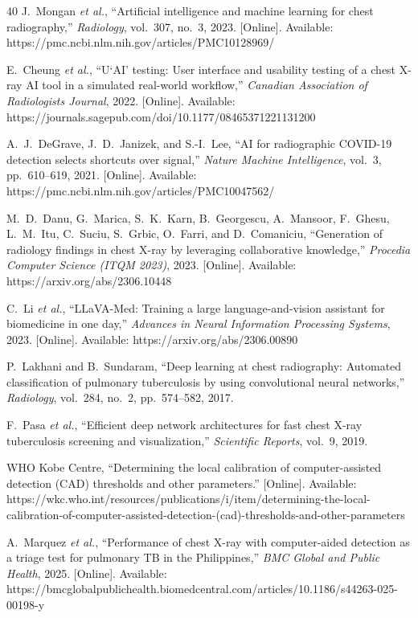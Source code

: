 \documentclass[conference, letterpaper]{IEEEtran}
\begin{document}
\begin{thebibliography}{40}
J.~Mongan \textit{et al.}, ``Artificial intelligence and machine learning for chest radiography,'' \textit{Radiology}, vol.~307, no.~3, 2023. [Online]. Available: https://pmc.ncbi.nlm.nih.gov/articles/PMC10128969/

E.~Cheung \textit{et al.}, ``U`AI' testing: User interface and usability testing of a chest X-ray AI tool in a simulated real-world workflow,'' \textit{Canadian Association of Radiologists Journal}, 2022. [Online]. Available: https://journals.sagepub.com/doi/10.1177/08465371221131200

A.~J.~DeGrave, J.~D.~Janizek, and S.-I.~Lee, ``AI for radiographic COVID-19 detection selects shortcuts over signal,'' \textit{Nature Machine Intelligence}, vol.~3, pp.~610--619, 2021. [Online]. Available: https://pmc.ncbi.nlm.nih.gov/articles/PMC10047562/

M.~D.~Danu, G.~Marica, S.~K.~Karn, B.~Georgescu, A.~Mansoor, F.~Ghesu, L.~M.~Itu, C.~Suciu, S.~Grbic, O.~Farri, and D.~Comaniciu, ``Generation of radiology findings in chest X-ray by leveraging collaborative knowledge,'' \textit{Procedia Computer Science (ITQM 2023)}, 2023. [Online]. Available: https://arxiv.org/abs/2306.10448

C.~Li \textit{et al.}, ``LLaVA-Med: Training a large language-and-vision assistant for biomedicine in one day,'' \textit{Advances in Neural Information Processing Systems}, 2023. [Online]. Available: https://arxiv.org/abs/2306.00890

P.~Lakhani and B.~Sundaram, ``Deep learning at chest radiography: Automated classification of pulmonary tuberculosis by using convolutional neural networks,'' \textit{Radiology}, vol.~284, no.~2, pp.~574--582, 2017.

F.~Pasa \textit{et al.}, ``Efficient deep network architectures for fast chest X-ray tuberculosis screening and visualization,'' \textit{Scientific Reports}, vol.~9, 2019.

WHO Kobe Centre, ``Determining the local calibration of computer-assisted detection (CAD) thresholds and other parameters.'' [Online]. Available: https://wkc.who.int/resources/publications/i/item/determining-the-local-calibration-of-computer-assisted-detection-(cad)-thresholds-and-other-parameters

A.~Marquez \textit{et al.}, ``Performance of chest X-ray with computer-aided detection as a triage test for pulmonary TB in the Philippines,'' \textit{BMC Global and Public Health}, 2025. [Online]. Available: https://bmcglobalpublichealth.biomedcentral.com/articles/10.1186/s44263-025-00198-y


\end{thebibliography}
\end{document}
